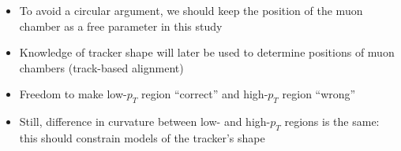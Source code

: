 \documentclass[compress]{beamer}
\begin{document}
\begin{frame}
\begin{columns}
\begin{itemize}
\item To avoid a circular argument, we should keep the position of the muon chamber as a free parameter in this study

\item Knowledge of tracker shape will later be used to determine positions of muon chambers (track-based alignment)

\item Freedom to make low-$p_T$ region ``correct'' and high-$p_T$ region ``wrong''

\item Still, difference in curvature between low- and high-$p_T$ regions is the same: this should constrain models of the tracker's shape
\end{itemize}
\end{columns}
\end{frame}
\end{document}
